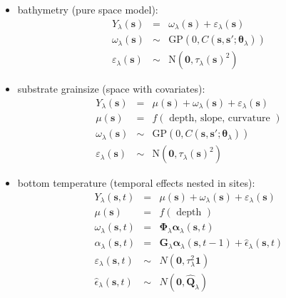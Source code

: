 \documentclass[letterpaper,portrait,11pt]{scrartcl}
\numberwithin{equation}{section}    %
\numberwithin{figure}{section}    %
\numberwithin{table}{section}       %
\begin{document}
\begin{itemize}
\item bathymetry (pure space model):
  \begin{eqnarray*}
    Y_\lambda(\bm{s}) &=& \omega_\lambda(\bm{s}) + \varepsilon_\lambda(\bm{s}) \\
    \omega_\lambda(\bm{s}) &\sim& \textrm{GP}(0, C(\bm{s},\bm{s}'; \bm{\theta}_\lambda))  \\
    \varepsilon_\lambda(\bm{s}) &\sim& \textrm{N}( \bm{0}, \tau_\lambda(\bm{s})^2)
  \end{eqnarray*}

\item substrate grainsize (space with covariates):
  \begin{eqnarray*}
   Y_\lambda(\bm{s}) &=& \mu(\bm{s}) + \omega_\lambda(\bm{s}) + \varepsilon_\lambda(\bm{s}) \\
   \mu(\bm{s}) &=& f ( \text{ depth, slope, curvature } ) \\
   \omega_\lambda(\bm{s}) &\sim& \textrm{GP}(0, C(\bm{s},\bm{s}'; \bm{\theta}_\lambda))  \\
   \varepsilon_\lambda(\bm{s}) &\sim& \textrm{N}(\bm{0}, \tau_\lambda(\bm{s})^2)
 \end{eqnarray*}

\item bottom temperature (temporal effects nested in sites):
  \begin{eqnarray*}
  Y_\lambda(\bm{s},t) &=& \mu(\bm{s}) + \omega_\lambda(\bm{s}) + \varepsilon_\lambda(\bm{s}) \\
  \mu(\bm{s}) &=& f ( \text{ depth } ) \\
  \omega_\lambda(\bm{s},t) &=& \bm{\Phi}_\lambda \bm{\alpha}_\lambda (\bm{s},t)  \\
  \alpha_\lambda(\bm{s},t)&=& \bm{G}_\lambda \bm{\alpha}_\lambda (\bm{s},t-1) + \hat{\epsilon}_\lambda(\bm{s},t)  \\
  \varepsilon_\lambda(\bm{s},t) &\sim& N(\bm{0}, \tau_\lambda^2 \bm{1} )  \\
  \hat{\epsilon}_\lambda(\bm{s},t) &\sim& N(\bm{0}, \bm{\hat{Q}}_\lambda)
  \end{eqnarray*}


\end{itemize}
\end{document}

